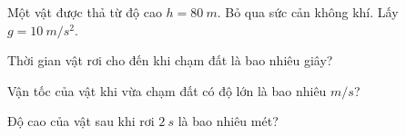 \begin{vidu}%
Một vật được thả từ độ cao $h = 80\ m$. Bỏ qua sức cản không khí. Lấy $g = 10\ m/s^2$. 
\begin{vdc}
Thời gian vật rơi cho đến khi chạm đất là bao nhiêu giây?
\end{vdc}
\begin{vdc}
Vận tốc của vật khi vừa chạm đất có độ lớn là bao nhiêu $m/s$?
\end{vdc}
\begin{vdc}
Độ cao của vật sau khi rơi $2\ s$ là bao nhiêu mét?
\end{vdc}
\end{vidu}



